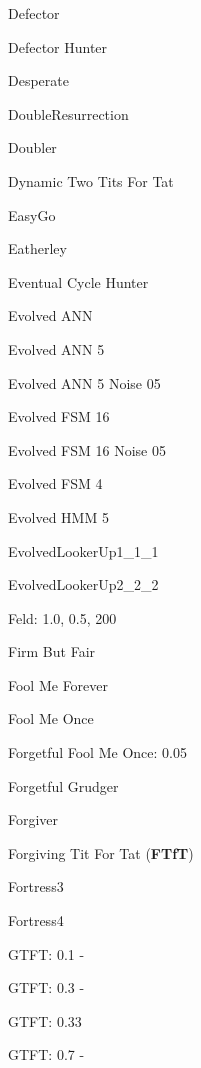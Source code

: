 \item Defector~\cite{Axelrod1981, Mittal2009, Press2012}
\item Defector Hunter~\cite{axelrodproject}
\item Desperate \cite{Van2015}
\item DoubleResurrection~\cite{Eckhart2015}
\item Doubler~\cite{prison}
\item Dynamic Two Tits For Tat~\cite{axelrodproject}
\item EasyGo~\cite{Li2011, prison}
\item Eatherley~\cite{Axelrod1980b}
\item Eventual Cycle Hunter~\cite{axelrodproject}
\item Evolved ANN~\cite{axelrodproject}
\item Evolved ANN 5~\cite{axelrodproject}
\item Evolved ANN 5 Noise 05~\cite{axelrodproject}
\item Evolved FSM 16~\cite{axelrodproject}
\item Evolved FSM 16 Noise 05~\cite{axelrodproject}
\item Evolved FSM 4~\cite{axelrodproject}
\item Evolved HMM 5~\cite{axelrodproject}
\item EvolvedLookerUp1\_1\_1~\cite{axelrodproject}
\item EvolvedLookerUp2\_2\_2~\cite{axelrodproject}
\item Feld: 1.0, 0.5, 200~\cite{Axelrod1980a}
\item Firm But Fair \cite{Frean1994}
\item Fool Me Forever~\cite{axelrodproject}
\item Fool Me Once~\cite{axelrodproject}
\item Forgetful Fool Me Once: 0.05\cite{axelrodproject}
\item Forgetful Grudger~\cite{axelrodproject}
\item Forgiver~\cite{axelrodproject}
\item Forgiving Tit For Tat (\textbf{FTfT})~\cite{axelrodproject}
\item Fortress3~\cite{Ashlock2006}
\item Fortress4~\cite{Ashlock2006}
\item GTFT: 0.1 -
\item GTFT: 0.3 -
\item GTFT: 0.33 \cite{Gaudesi2016, Nowak1993}
\item GTFT: 0.7 -

